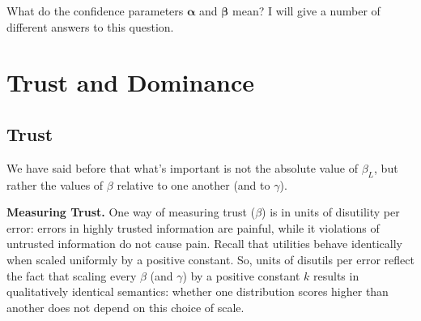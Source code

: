 \documentclass[twoside]{article} %
\theoremstyle{plain}
\theoremstyle{definition}
\newcommand{\balpha}{\boldsymbol\alpha}
\newcommand{\bbeta}{\boldsymbol\beta}
\begin{document}
    What do the confidence parameters $\balpha$ and $\bbeta$ mean?
    I will give a number of different answers to this question.



\section{Trust and Dominance}\label{sec:trust-dominance}


    \subsection{Trust}

    We have said before that what's important is not the absolute value of $\beta_L$, but rather the values of $\beta$ relative to one another (and to $\gamma$).



    \textbf{Measuring Trust.}
    One way of measuring trust ($\beta$) is in units of disutility per error: errors in highly trusted information are painful, while it violations of untrusted information do not cause pain.
    Recall that utilities behave identically when scaled uniformly by a positive constant.
    So, units of disutils per error reflect the fact that scaling every $\beta$ (and $\gamma$) by a positive constant $k$ results in qualitatively identical semantics: whether one distribution scores higher than another does not depend on this choice of scale.
\end{document}
